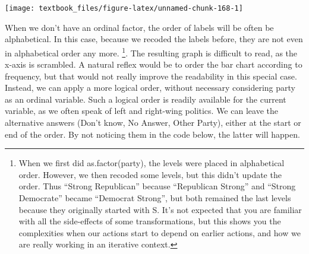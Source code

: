 \documentclass[]{tufte-book}
\newenvironment{Shaded}{}{}
\newcommand{\DataTypeTok}[1]{\textcolor[rgb]{0.56,0.13,0.00}{#1}}
\newcommand{\DecValTok}[1]{\textcolor[rgb]{0.25,0.63,0.44}{#1}}
\newcommand{\KeywordTok}[1]{\textcolor[rgb]{0.00,0.44,0.13}{\textbf{#1}}}
\newcommand{\NormalTok}[1]{#1}
\newcommand{\OperatorTok}[1]{\textcolor[rgb]{0.40,0.40,0.40}{#1}}
\newcommand{\StringTok}[1]{\textcolor[rgb]{0.25,0.44,0.63}{#1}}
\begin{document}
\begin{Shaded}
\end{Shaded}

\texttt{[image: textbook\_files/figure-latex/unnamed-chunk-168-1]}

When we don't have an ordinal factor, the order of labels will be often be alphabetical. In this case, because we recoded the labels before, they are not even in alphabetical order any more. \footnote{When we first did as.factor(party), the levels were placed in alphabetical order. However, we then recoded some levels, but this didn't update the order. Thus ``Strong Republican'' because ``Republican Strong'' and ``Strong Democrate'' became ``Democrat Strong'', but both remained the last levels because they originally started with S. It's not expected that you are familiar with all the side-effects of some transformations, but this shows you the complexities when our actions start to depend on earlier actions, and how we are really working in an iterative context.}. The resulting graph is difficult to read, as the x-axis is scrambled. A natural reflex would be to order the bar chart according to frequency, but that would not really improve the readability in this special case. Instead, we can apply a more logical order, without necessary considering party as an ordinal variable. Such a logical order is readily available for the current variable, as we often speak of left and right-wing politics. We can leave the alternative answers (Don't know, No Answer, Other Party), either at the start or end of the order. By not noticing them in the code below, the latter will happen.

\begin{Shaded}
\end{Shaded}
\end{document}
